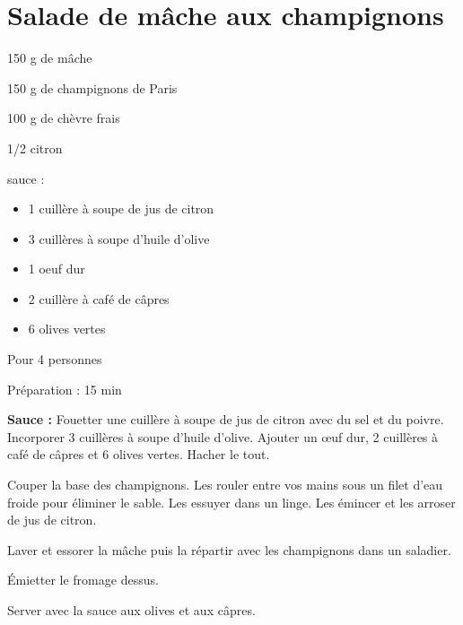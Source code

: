 \section{Salade de mâche aux champignons}

\begin{ingredients}
\item 150 g de mâche
\item 150 g de champignons de Paris
\item 100 g de chèvre frais
\item 1/2 citron
\item sauce :
\begin{itemize}
\item 1 cuillère à soupe de jus de citron
\item 3 cuillères à soupe d'huile d'olive
\item 1 oeuf dur
\item 2 cuillère à café de câpres
\item 6 olives vertes
\end{itemize}
\end{ingredients}
\begin{infos}
\item Pour 4 personnes		%
\item Préparation : 15 min		%
\end{infos}
\begin{etapes}
\item \textbf{Sauce :} Fouetter une cuillère à soupe de jus de citron avec du sel et du poivre. Incorporer 3 cuillères à soupe d'huile d'olive. Ajouter un œuf dur, 2 cuillères à café de câpres et 6 olives vertes. Hacher le tout.
\item Couper la base des champignons. Les rouler entre vos mains sous un filet d'eau froide pour éliminer le sable. Les essuyer dans un linge. Les émincer et les arroser de jus de citron.
\item Laver et essorer la mâche puis la répartir avec les champignons dans un saladier.
\item Émietter le fromage dessus.
\item Server avec la sauce aux olives et aux câpres.
\end{etapes}
\begin{conseils}
\end{conseils}
